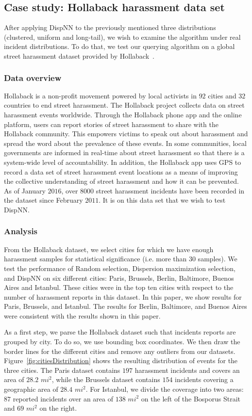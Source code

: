 \documentclass{acm_proc_article-sp}
\begin{document}
\subsection{Case study: Hollaback harassment data set}
After applying DispNN to the previously mentioned three distributions (clustered, uniform and long-tail), we wish to examine the algorithm under real incident distributions. To do that, we test our querying algorithm on a global street harassment dataset provided by Hollaback~\cite{hollaback}.
\subsubsection{Data overview}
Hollaback is a non-profit movement powered by local activists in $92$ cities and $32$ countries to end street harassment. The Hollaback project collects data on street harassment events worldwide. Through the Hollaback phone app and the online platform, users can report stories of street harassment to share with the Hollaback community. This empowers victims to speak out about harassment and spread the word about the prevalence of these events. In some communities, local governments are informed in real-time about street harassment so that there is a system-wide level of accountability. In addition, the Hollaback app uses GPS to record a data set of street harassment event locations as a means of improving the collective understanding of street harassment and how it can be prevented.  As of January $2016$, over $8000$ street harassment incidents have been recorded in the dataset since February $2011$.  It is on this data set that we wish to test DispNN.\par
\subsubsection{Analysis}
From the Hollaback dataset, we select cities for which we have enough harassment samples for statistical significance (i.e. more than 30 samples). We test the performance of Random selection, Dispersion maximization selection, and DispNN on six different cities: Paris, Brussels, Berlin, Baltimore, Buenos Aires and Istanbul. These cities were in the top ten cities with respect to the number of harassment reports in this dataset. In this paper, we show results for Paris, Brussels, and Istanbul. The results for Berlin, Baltimore, and Buenos Aires were consistent with the results shown in this paper. \par

As a first step, we parse the Hollaback dataset such that incidents reports are grouped by city. To do so, we use bounding box coordinates. We then draw the border lines for the different cities and remove any outliers from our datasets. Figure~\ref{fig:citiesDistribution} shows the resulting distribution of events for the three cities. The Paris dataset contains $197$ harassment incidents and covers an area of $28.2$ $mi^2$, while the Brussels dataset contains $154$ incidents covering a geographic area of $28.4$ $mi^2$. For Istanbul, we divide the coverage into two areas: $87$ reported incidents over an area of $138$ $mi^2$ on the left of the Bosporus Strait and $69$ $mi^2$ on the right. \par
\end{document}

